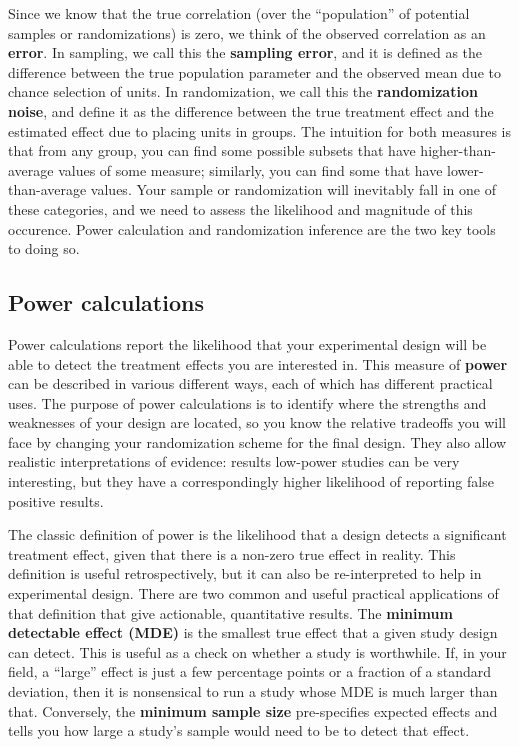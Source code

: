 Since we know that the true correlation
(over the ``population'' of potential samples or randomizations)
is zero, we think of the observed correlation as an \textbf{error}.
In sampling, we call this the \textbf{sampling error},
and it is defined as the difference between the true population parameter
and the observed mean due to chance selection of units.
In randomization, we call this the \textbf{randomization noise},
and define it as the difference between the true treatment effect
and the estimated effect due to placing units in groups.
The intuition for both measures is that from any group,
you can find some possible subsets that have higher-than-average values of some measure;
similarly, you can find some that have lower-than-average values.
Your sample or randomization will inevitably fall in one of these categories,
and we need to assess the likelihood and magnitude of this occurence.
Power calculation and randomization inference are the two key tools to doing so.

\subsection{Power calculations}

Power calculations report the likelihood that your experimental design
will be able to detect the treatment effects you are interested in.
This measure of \textbf{power} can be described in various different ways,
each of which has different practical uses.
The purpose of power calculations is to identify where the strengths and weaknesses
of your design are located, so you know the relative tradeoffs you will face
by changing your randomization scheme for the final design.
They also allow realistic interpretations of evidence:
results low-power studies can be very interesting,
but they have a correspondingly higher likelihood
of reporting false positive results.

The classic definition of power
is the likelihood that a design detects a significant treatment effect,
given that there is a non-zero true effect in reality.
This definition is useful retrospectively,
but it can also be re-interpreted to help in experimental design.
There are two common and useful practical applications
of that definition that give actionable, quantitative results.
The \textbf{minimum detectable effect (MDE)}
is the smallest true effect that a given study design can detect.
This is useful as a check on whether a study is worthwhile.
If, in your field, a ``large'' effect is just a few percentage points
or a fraction of a standard deviation,
then it is nonsensical to run a study whose MDE is much larger than that.
Conversely, the \textbf{minimum sample size} pre-specifies expected effects
and tells you how large a study's sample would need to be to detect that effect.


